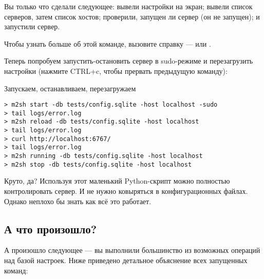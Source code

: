 Вы только что сделали следующее: вывели настройки на экран; вывели
список серверов, затем список хостов; проверили, запущен ли сервер
(он не запущен); и запустили сервер.

Чтобы узнать больше об этой команде, вызовите справку ---  или .

Теперь попробуем запустить-остановить сервер в sudo-режиме и
перезагрузить настройки (нажмите CTRL+c, чтобы прервать предыдущую
команду):

\begin{code}{Запускаем, останавливаем, перезагружаем}
\begin{lstlisting}
> m2sh start -db tests/config.sqlite -host localhost -sudo
> tail logs/error.log
> m2sh reload -db tests/config.sqlite -host localhost
> tail logs/error.log
> curl http://localhost:6767/
> tail logs/error.log
> m2sh running -db tests/config.sqlite -host localhost
> m2sh stop -db tests/config.sqlite -host localhost
\end{lstlisting}
\end{code}

Круто, да? Используя этот маленький Python-скрипт можно полностью
контролировать сервер. И не нужно ковыряться в конфигурационных
файлах. Однако неплохо бы знать как всё это работает.

\subsection{А что произошло?}

А произошло следующее --- вы выполнили большинство из возможных
операций над базой настроек. Ниже приведено детальное
объяснение всех запущенных команд:

